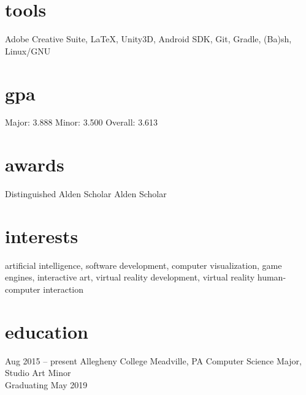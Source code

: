 \documentclass[]{friggeri-cv}
\begin{document}
\begin{aside}
  \section{tools}\vspace{0.05cm}
    Adobe Creative Suite, \LaTeX , Unity3D, Android SDK, Git, Gradle, (Ba)sh, Linux/GNU
  \section{gpa}\vspace{0.1cm}
  	Major: 3.888
  	Minor: 3.500
    Overall: 3.613\vspace{0.1cm}
  \section{awards}\vspace{0.05cm}
  Distinguished Alden Scholar\vspace{0.1cm}
  Alden Scholar\vspace{0.1cm}
\end{aside}

\section{interests}

artificial intelligence, software development, computer visualization, game engines, interactive art, virtual reality development, virtual reality human-computer interaction

\section{education}
\begin{entrylist}
  \entry
    {Aug 2015 -- present}
    {Allegheny College}
    {Meadville, PA}
    {Computer Science Major, Studio Art Minor\\Graduating May 2019}
\end{entrylist}
\end{document}
